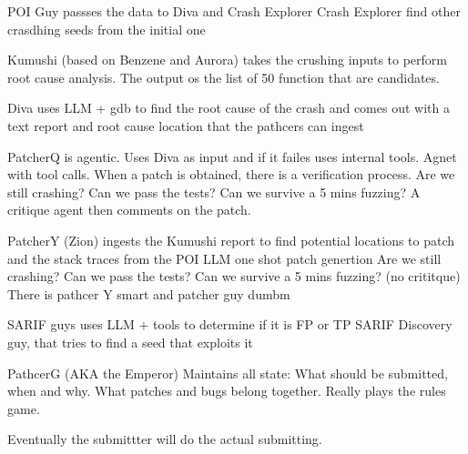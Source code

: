 POI Guy passses the data to Diva and Crash Explorer
Crash Explorer find other crasdhing seeds from the initial one

Kumushi (based on Benzene and Aurora) takes the crushing inputs to perform root cause analysis.
The output os the list of 50 function that are candidates.

Diva uses LLM + gdb to find the root cause of the crash
and comes out with a text report and root cause location that the pathcers can ingest 

PatcherQ is agentic. Uses Diva as input and if it failes uses internal tools.
Agnet with tool calls.
When a patch is obtained, there is a verification process.
Are we still crashing?
Can we pass the tests?
Can we survive a 5 mins fuzzing?
A critique agent then comments on the patch.

PatcherY (Zion) ingests the Kumushi report to find potential locations to patch and the stack traces from the POI 
LLM one shot patch genertion
Are we still crashing?
Can we pass the tests?
Can we survive a 5 mins fuzzing?
(no crititque)
There is pathcer Y smart and patcher guy dumbm

SARIF guys uses LLM + tools to determine if it is FP or TP
SARIF Discovery guy, that tries to find a seed that exploits it

PathcerG (AKA the Emperor)
Maintains all state: What should be submitted, when and why.
What patches and bugs belong together.
Really plays the rules game.


Eventually the submittter will do the actual submitting.















